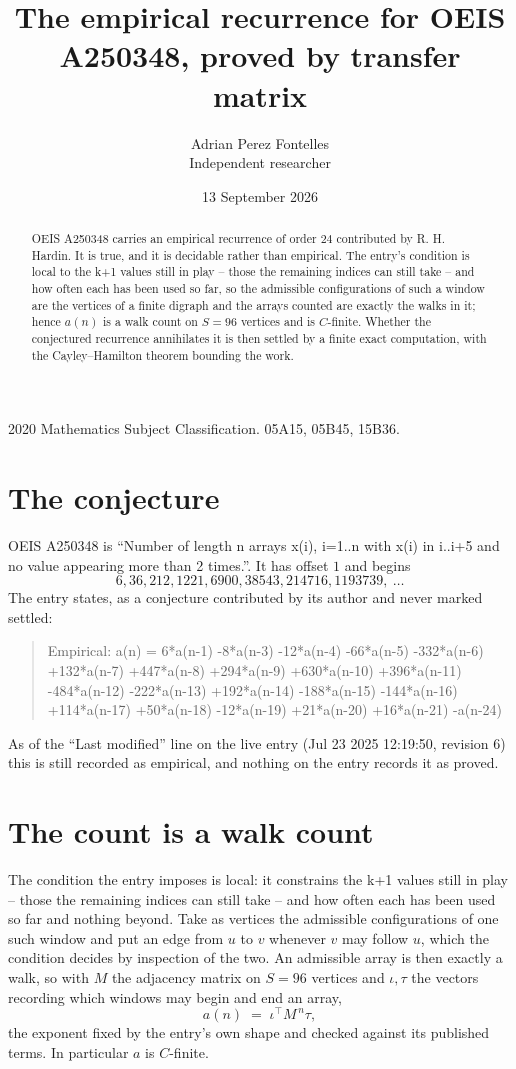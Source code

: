 \documentclass[11pt,a4paper]{article}
\title{The empirical recurrence for OEIS A250348, proved by transfer matrix}
\author{Adrian Perez Fontelles\\ \small Independent researcher}
\date{13 September 2026}
\theoremstyle{plain}
\theoremstyle{definition}
\begin{document}
\maketitle

\begin{abstract}
OEIS A250348 carries an empirical recurrence of order $24$ contributed by R. H. Hardin. It is
true, and it is decidable rather than empirical. The entry's condition is local to the k+1 values still in play -- those the remaining indices can still take -- and how often each has been used so far, so
the admissible configurations of such a window are the vertices of a finite digraph and the
arrays counted are exactly the walks in it; hence $a(n)$ is a walk count on $S=96$ vertices
and is $C$-finite. Whether the conjectured recurrence annihilates it is then settled by a
finite exact computation, with the Cayley--Hamilton theorem bounding the work.
\end{abstract}

\noindent\small 2020 Mathematics Subject Classification. 05A15, 05B45, 15B36.\normalsize

\section{The conjecture}

OEIS A250348 is ``Number of length n arrays x(i), i=1..n with x(i) in i..i+5 and no value appearing more than 2 times.''. It has offset $1$ and begins
\[
6, 36, 212, 1221, 6900, 38543, 214716, 1193739,\ \dots
\]
The entry states, as a conjecture contributed by its author and never marked settled:
\begin{quote}
Empirical: a(n) = 6*a(n-1) -8*a(n-3) -12*a(n-4) -66*a(n-5) -332*a(n-6) +132*a(n-7) +447*a(n-8) +294*a(n-9) +630*a(n-10) +396*a(n-11) -484*a(n-12) -222*a(n-13) +192*a(n-14) -188*a(n-15) -144*a(n-16) +114*a(n-17) +50*a(n-18) -12*a(n-19) +21*a(n-20) +16*a(n-21) -a(n-24)
\end{quote}
As of the ``Last modified'' line on the live entry (Jul 23 2025 12:19:50, revision 6) this is still
recorded as empirical, and nothing on the entry records it as proved.

\section{The count is a walk count}

The condition the entry imposes is local: it constrains the k+1 values still in play -- those the remaining indices can still take -- and how often each has been used so far and nothing beyond. Take as
vertices the admissible configurations of one such window and put an edge from $u$ to $v$
whenever $v$ may follow $u$, which the condition decides by inspection of the two. An
admissible array is then exactly a walk, so with $M$ the adjacency matrix on $S=96$ vertices
and $\iota,\tau$ the vectors recording which windows may begin and end an array,
\[
a(n)\;=\;\iota^{\!\top}M^{\,n}\tau ,
\]
the exponent fixed by the entry's own shape and checked against its published terms. In
particular $a$ is $C$-finite.
\end{document}

